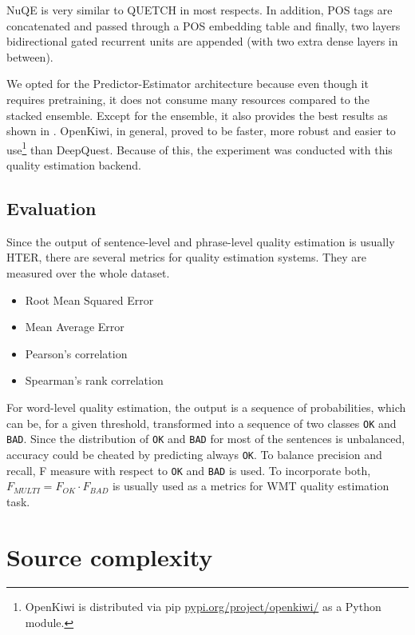 NuQE is very similar to QUETCH in most respects. In addition, POS tags are concatenated and passed through a POS embedding table and finally, two layers bidirectional gated recurrent units are appended (with two extra dense layers in between).

We opted for the Predictor-Estimator architecture because even though it requires pretraining, it does not consume many resources compared to the stacked ensemble. Except for the ensemble, it also provides the best results as shown in \cite{openkiwi}. OpenKiwi, in general, proved to be faster, more robust and easier to use\footnote{OpenKiwi is distributed via pip \href{https://pypi.org/project/openkiwi/}{pypi.org/project/openkiwi/} as a Python module.} than DeepQuest. Because of this, the experiment was conducted with this quality estimation backend.

\subsection{Evaluation}

Since the output of sentence-level and phrase-level quality estimation is usually HTER, there are several metrics for quality estimation systems. They are measured over the whole dataset.

\begin{itemize}
    \item Root Mean Squared Error
    \item Mean Average Error
    \item Pearson's correlation
    \item Spearman's rank correlation
\end{itemize}

For word-level quality estimation, the output is a sequence of probabilities, which can be, for a given threshold, transformed into a sequence of two classes \texttt{OK} and \texttt{BAD}. Since the distribution of \texttt{OK} and \texttt{BAD} for most of the sentences is unbalanced, accuracy could be cheated by predicting always \texttt{OK}. To balance precision and recall, F measure with respect to \texttt{OK} and \texttt{BAD} is used. To incorporate both, $F_{MULTI} = F_{OK}\cdot F_{BAD}$ is usually used as a metrics for WMT quality estimation task.

\section{Source complexity}

